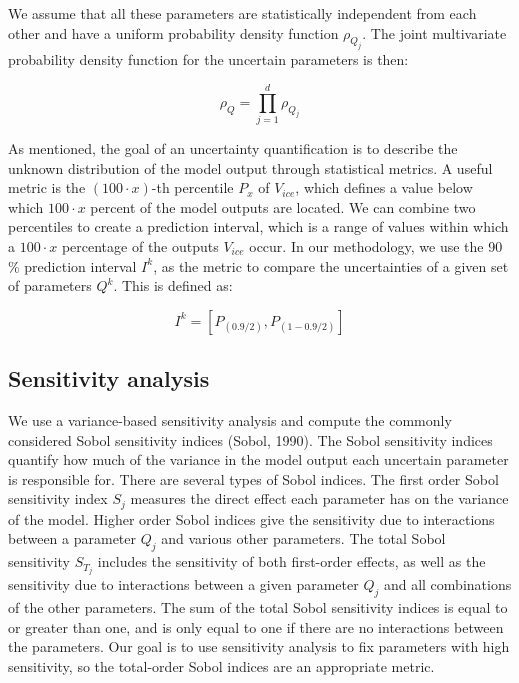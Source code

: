 We assume that all these parameters are statistically independent from each other and have a uniform probability
density function $\rho_{Q_j}$. The joint multivariate probability density function for the uncertain parameters
is then:

\begin{equation}
\rho_{Q} = \prod_{j = 1}^{d} \rho_{Q_j}
\end{equation}

As mentioned, the goal of an uncertainty quantification is to describe the unknown distribution of the model
output through statistical metrics. A useful metric is the $(100 \cdot x)$-th percentile $P_x$ of $V_{ice}$,
which defines a value below  which $100 \cdot x$ percent of the model outputs are located. We can combine two
percentiles to create a prediction interval, which is a range of values within which a $100 \cdot x$
percentage of the outputs $V_{ice}$ occur. In our methodology, we use the 90 \% prediction interval $I^k$, as
the metric to compare the uncertainties of a given set of parameters $Q^k$. This is defined as:  

\begin{equation}
I^k = [P_{(0.9/2)}, P_{(1-0.9/2)}]
\end{equation}

\subsection{Sensitivity analysis}

We use a variance-based sensitivity analysis and compute the commonly considered Sobol sensitivity indices
(Sobol, 1990). The Sobol sensitivity indices quantify how much of the variance in the model output each
uncertain parameter is responsible for. There are several types of Sobol indices. The first order Sobol
sensitivity index $S_j$ measures the direct effect each parameter has on the variance of the model. Higher order
Sobol indices give the sensitivity due to interactions between a parameter $Q_j$ and various other parameters.
The total Sobol sensitivity $S_{T_{j}}$ includes the sensitivity of both first-order effects, as well as the
sensitivity due to interactions between a given parameter $Q_j$ and all combinations of the other
parameters. The sum of the total Sobol sensitivity indices is equal to or greater than one, and is only equal to
one if there are no interactions between the parameters. Our goal is to use sensitivity analysis to fix
parameters with high sensitivity, so the total-order Sobol indices are an appropriate metric.

